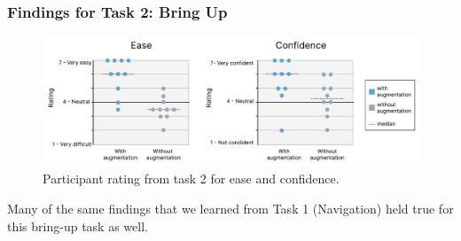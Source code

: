 \documentclass [11pt, proquest] {uwthesis}[2020/02/24]
\begin{document}
\subsubsection{Findings for Task 2: Bring Up}

\begin{figure}
    \centering
    \includegraphics[width=.95\linewidth]{ARDW_figures/Study-2/task-2.pdf}
    \caption{Participant rating from task 2 for ease and confidence.}
    \label{fig:Eval-Part2}
\end{figure}

Many of the same findings that we learned from Task 1 (Navigation) held true for this bring-up task as well.
\end{document}
